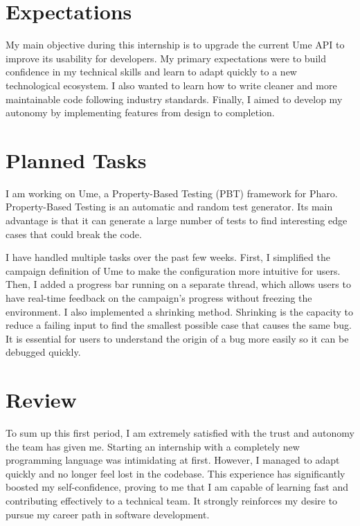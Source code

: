 \documentclass[12pt,a4paper]{report} %
\begin{document}
\chapter{Expectations}
My main objective during this internship is to upgrade the current Ume API to 
improve its usability for developers. My primary expectations were to build 
confidence in my technical skills and learn to adapt quickly to a new 
technological ecosystem. I also wanted to learn how to write cleaner and 
more maintainable code following industry standards. Finally, I aimed to 
develop my autonomy by implementing features from design to completion.

\chapter{Planned Tasks}
I am working on Ume, a Property-Based Testing (PBT) framework for Pharo. 
Property-Based Testing is an automatic and random test generator. 
Its main advantage is that it can generate a large number of tests to find 
interesting edge cases that could break the code.

I have handled multiple tasks over the past few weeks. 
First, I simplified the campaign definition of Ume to make the configuration 
more intuitive for users. Then, I added a progress bar running on a separate 
thread, which allows users to have real-time feedback on the campaign's 
progress without freezing the environment. I also implemented a shrinking 
method. Shrinking is the capacity to reduce a failing input to find the 
smallest possible case that causes the same bug. It is essential for users 
to understand the origin of a bug more easily so it can be debugged quickly.

\chapter{Review}
To sum up this first period, I am extremely satisfied with the trust and 
autonomy the team has given me. Starting an internship with a completely new 
programming language was intimidating at first. However, I managed to adapt 
quickly and no longer feel lost in the codebase. This experience has 
significantly boosted my self-confidence, proving to me that I am capable of 
learning fast and contributing effectively to a technical team. It strongly 
reinforces my desire to pursue my career path in software development.
\end{document}
